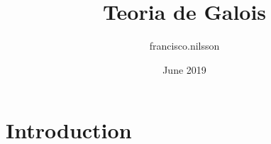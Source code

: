 \documentclass{article}
\title{Teoria de Galois}
\author{francisco.nilsson }
\date{June 2019}
\begin{document}
\maketitle

\section{Introduction}
\end{document}
